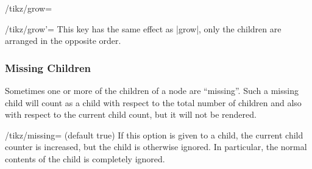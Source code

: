 \begin{key}{/tikz/grow=}
\begin{codeexample}[]
\end{codeexample}

\begin{codeexample}[]
\end{codeexample}
\end{key}

\begin{key}{/tikz/grow'=}
    This key has the same effect as |grow|, only the children are arranged in
    the opposite order.
\end{key}


\subsubsection{Missing Children}

Sometimes one or more of the children of a node are ``missing''. Such a missing
child will count as a child with respect to the total number of children and
also with respect to the current child count, but it will not be rendered.

\begin{key}{/tikz/missing= (default true)}
    If this option is given to a child, the current child counter is increased,
    but the child is otherwise ignored. In particular, the normal contents of
    the child is completely ignored.
\begin{codeexample}[]
\end{codeexample}
\end{key}


